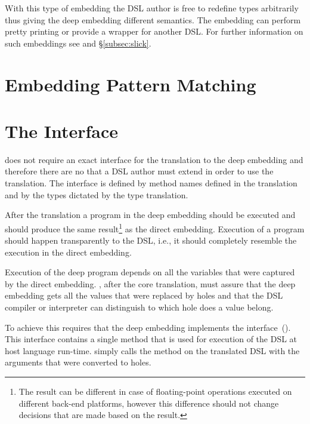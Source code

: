 With this type of embedding the DSL author is free to redefine types arbitrarily thus giving the
 deep embedding different semantics. The embedding can perform pretty printing or provide a wrapper
 for another DSL. For further information on such embeddings see \cite{hofer_polymorphic_2008}
 and \S \ref{subsec:slick}.

\section{Embedding Pattern Matching}
\label{sec:pattern-matching}


\section{The \yy Interface}
\label{sec:yy-interface}

\yy does not require an exact interface for the translation to the deep embedding and therefore there are no  that
a DSL author must extend in order to use the translation. The interface is defined by method names
defined in the translation and by the types dictated by the type translation.

After the translation a program in the deep embedding should be executed and should produce
the same result\footnote{The result can be different in case of floating-point operations executed on
different back-end platforms, however this difference should not change decisions that are made based on the result.}
as the direct embedding. Execution of a program should happen transparently to the DSL, i.e., it should completely
resemble the execution in the direct embedding.

Execution of the deep program depends on all the variables that were captured by the
direct embedding. \yy, after the core translation, must assure that the deep embedding
gets all the values that were replaced by holes and that the DSL compiler or interpreter
can distinguish to which hole does a value belong.

To achieve this \yy requires that the deep embedding implements the
  interface~(). This interface
 contains a single method  that is used for execution of
 the DSL at host language run-time. \yy simply calls the method 
on the translated DSL with the arguments that were converted to holes.

